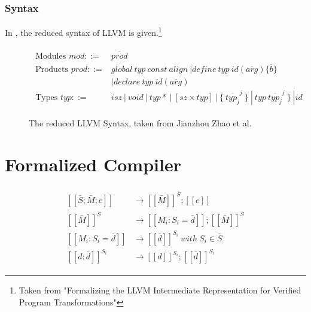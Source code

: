 \documentclass[10pt,a4paper,master=cws, masteroption=ai,english,inputenc=utf8]{kulemt}
\begin{document}
\subsubsection{Syntax}
In , the reduced syntax of LLVM is given.\footnote{Taken from "Formalizing the LLVM Intermediate
Representation for Verified Program
Transformations"}
\begin{figure}[!htb]
\begin{align*}
\begin{aligned}
\text{Modules }\mathit{mod} ::= &\overline{\mathit{prod}} \\
\text{Products }prod ::= & \mathit{global}\ \mathit{typ}\ \mathit{const}\ \mathit{align}\ | \mathit{define\ typ\ id(\overline{arg})\{\overline{b}\}}\\
&| \mathit{declare\ typ\ id(\overline{arg})} \\
\text{Types } \mathit{typ} ::= &\mathit{ isz\ |\ void\ |\ typ*\ |\ \left[sz \times typ\right]\ |\ \lbrace\ \overline{typ_{j}}^{j}\ \rbrace\ |\ typ\ \overline{typ_{j}}^{j}\ \rbrace\ | id}
\end{aligned}
\end{align*}
\label{fig:LLVMSyntax}
\caption{The reduced LLVM Syntax, taken from Jianzhou Zhao et al.}
\end{figure}



\section{Formalized Compiler}
\newcommand{\compile}[1]{\left[\left[#1\right]\right]}
\newcommand{\makes}{& \rightarrow}
\begin{align*}
\begin{aligned}
\compile{\bar{S};\bar{M};e} \makes \compile{\bar{M}}^{\bar{S}};\compile{e}\\ 
\compile{\bar{M}}^{\bar{S}}\makes \compile{M_{i}:S_{i} = \bar{d}};\compile{\bar{M}}^{\bar{S}}\\
\compile{M_{i}:S_{i} = \bar{d}} \makes \compile{\bar{d}}^{S_{i}} \mathit{\ with\ } S_{i} \in \bar{S} \\
\compile{d:\bar{d}}^{S_{i}} \makes \compile{d}^{S_{i}};\compile{\bar{d}}^{S_{i}}
\end{aligned}
\end{align*}
\end{document}
